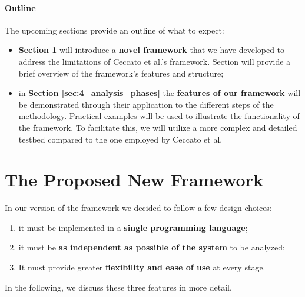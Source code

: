 \paragraph{Outline}
\label{par:4_outline}
The upcoming sections provide an outline of what to expect:

\begin{itemize}
	\item \textbf{Section \ref{sec:4_framework_presentation}} will introduce a \textbf{novel framework} that we have developed to address the limitations of Ceccato et al.'s framework. Section will provide a brief overview of the framework's features and structure;
	
	\item in \textbf{Section \ref{sec:4_analysis_phases}} the \textbf{features of our framework} will be demonstrated through their application to the different steps of the methodology. Practical examples will be used to illustrate the functionality of the framework. To facilitate this, we will utilize a more complex and detailed testbed compared to the one employed by Ceccato et al.
\end{itemize}

\section{The Proposed New Framework}
\label{sec:4_framework_presentation}
In our version of the framework we decided to follow a few design choices:

\begin{enumerate}
	\item it must be implemented in a \textbf{single programming language};
	\item it must be \textbf{as independent as possible of the system} to be analyzed;
	\item It must provide greater \textbf{flexibility and ease of use} at every stage.
\end{enumerate}
In the following, we discuss these three features in more detail.

